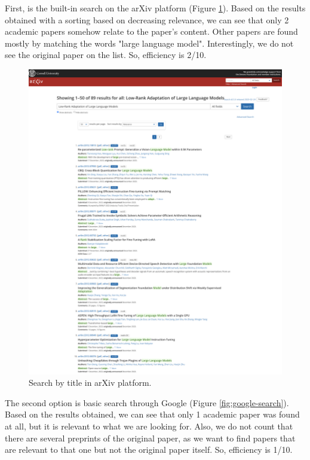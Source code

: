 \documentclass{article}
\begin{document}
    First, is the built-in search on the arXiv platform (Figure \ref{fig:arxiv-search}). Based on the results obtained with a sorting based on decreasing relevance, we can see that only 2 academic papers somehow relate to the paper's content. Other papers are found mostly by matching the words "large language model". Interestingly, we do not see the original paper on the list. So, efficiency is 2/10.

    \begin{figure}[H]
        \centering
        \includegraphics[width=0.89\linewidth]{img/search_arxiv.png}
        \caption{Search by title in arXiv platform.}
        \label{fig:arxiv-search}
    \end{figure}

    The second option is basic search through Google (Figure \ref{fig:google-search}). Based on the results obtained, we can see that only 1 academic paper was found at all, but it is relevant to what we are looking for. Also, we do not count that there are several preprints of the original paper, as we want to find papers that are relevant to that one but not the original paper itself. So, efficiency is 1/10. 
    
\end{document}
